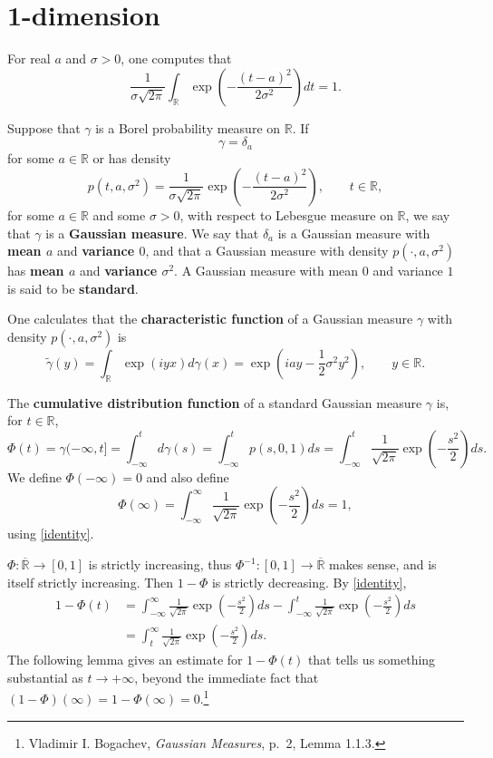 \documentclass{article}
\theoremstyle{definition}
\theoremstyle{definition}
\begin{document}
\section{1-dimension}
For real $a$ and $\sigma>0$, one computes that
\begin{equation}
\frac{1}{\sigma \sqrt{2\pi}} \int_{\mathbb{R}} \exp\left( - \frac{(t-a)^2}{2\sigma^2} \right) dt = 1.
\label{identity}
\end{equation}

Suppose that $\gamma$ is a Borel probability measure on $\mathbb{R}$. If 
\[
\gamma=\delta_a
\]
 for some
$a \in \mathbb{R}$ or has density
\[
p(t,a,\sigma^2) = \frac{1}{\sigma\sqrt{2\pi}}  \exp\left( - \frac{(t-a)^2}{2\sigma^2} \right),
\qquad t \in \mathbb{R},
\]
for some $a \in \mathbb{R}$ and some $\sigma>0$,
with respect to Lebesgue measure on $\mathbb{R}$, we say that $\gamma$ is a \textbf{Gaussian measure}.
We say that $\delta_a$ is a Gaussian measure with \textbf{mean $a$} and \textbf{variance $0$}, and
that a Gaussian measure with density $p(\cdot,a,\sigma^2)$ has \textbf{mean $a$} and \textbf{variance $\sigma^2$}.
A Gaussian measure with mean $0$ and variance $1$ is said to be \textbf{standard}.

One calculates that the \textbf{characteristic function} of a Gaussian measure $\gamma$ with density $p(\cdot,a,\sigma^2)$
is
\begin{equation}
\widetilde{\gamma}(y) = \int_{\mathbb{R}} \exp(i yx) d\gamma(x)
=\exp\left( iay - \frac{1}{2}\sigma^2 y^2 \right), \qquad y \in \mathbb{R}.
\label{characteristic}
\end{equation}

The \textbf{cumulative distribution function} of a standard Gaussian measure  $\gamma$ is, for
$t \in \mathbb{R}$,
\[
\Phi(t) = \gamma(-\infty,t] =\int_{-\infty}^t d\gamma(s) = 
\int_{-\infty}^t p(s,0,1) ds
=\int_{-\infty}^t \frac{1}{\sqrt{2\pi}} \exp\left(- \frac{s^2}{2} \right) ds.
\]
We define $\Phi(-\infty)=0$ and also define 
\[
\Phi(\infty) = \int_{-\infty}^\infty \frac{1}{\sqrt{2\pi}} \exp\left(- \frac{s^2}{2} \right) ds = 1,
\]
using \eqref{identity}.

$\Phi:\overline{\mathbb{R}} \to [0,1]$ is strictly increasing, thus 
$\Phi^{-1}:[0,1] \to \overline{\mathbb{R}}$ makes sense, and is itself strictly increasing. Then 
$1-\Phi$ is strictly decreasing.
By \eqref{identity},
\begin{align*}
1-\Phi(t) &=  \int_{-\infty}^\infty \frac{1}{\sqrt{2\pi}} \exp\left( - \frac{s^2}{2} \right) ds
-\int_{-\infty}^t \frac{1}{\sqrt{2\pi}} \exp\left(- \frac{s^2}{2} \right) ds\\
&=\int_t^\infty \frac{1}{\sqrt{2\pi}} \exp\left(- \frac{s^2}{2} \right) ds.
\end{align*}
The following lemma gives an estimate for
$1-\Phi(t)$ that tells us something substantial as $t \to +\infty$, beyond the immediate fact that $(1-\Phi)(\infty)=1-\Phi(\infty)=0$.\footnote{Vladimir I. Bogachev,
{\em Gaussian Measures}, p.~2, Lemma 1.1.3.}
\end{document}
